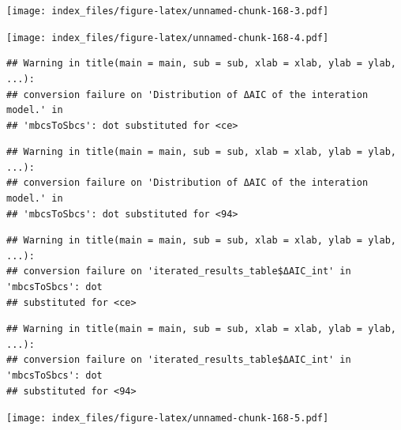 \documentclass[
]{article}
\newenvironment{Shaded}{\begin{snugshade}}{\end{snugshade}}
\newcommand{\AttributeTok}[1]{\textcolor[rgb]{0.77,0.63,0.00}{#1}}
\newcommand{\FunctionTok}[1]{\textcolor[rgb]{0.00,0.00,0.00}{#1}}
\newcommand{\NormalTok}[1]{#1}
\newcommand{\SpecialCharTok}[1]{\textcolor[rgb]{0.00,0.00,0.00}{#1}}
\newcommand{\StringTok}[1]{\textcolor[rgb]{0.31,0.60,0.02}{#1}}
\begin{document}
\texttt{[image: index\_files/figure-latex/unnamed-chunk-168-3.pdf]}

\begin{Shaded}
\end{Shaded}

\texttt{[image: index\_files/figure-latex/unnamed-chunk-168-4.pdf]}

\begin{Shaded}
\end{Shaded}

\begin{verbatim}
## Warning in title(main = main, sub = sub, xlab = xlab, ylab = ylab, ...):
## conversion failure on 'Distribution of ΔAIC of the interation model.' in
## 'mbcsToSbcs': dot substituted for <ce>
\end{verbatim}

\begin{verbatim}
## Warning in title(main = main, sub = sub, xlab = xlab, ylab = ylab, ...):
## conversion failure on 'Distribution of ΔAIC of the interation model.' in
## 'mbcsToSbcs': dot substituted for <94>
\end{verbatim}

\begin{verbatim}
## Warning in title(main = main, sub = sub, xlab = xlab, ylab = ylab, ...):
## conversion failure on 'iterated_results_table$ΔAIC_int' in 'mbcsToSbcs': dot
## substituted for <ce>
\end{verbatim}

\begin{verbatim}
## Warning in title(main = main, sub = sub, xlab = xlab, ylab = ylab, ...):
## conversion failure on 'iterated_results_table$ΔAIC_int' in 'mbcsToSbcs': dot
## substituted for <94>
\end{verbatim}

\texttt{[image: index\_files/figure-latex/unnamed-chunk-168-5.pdf]}
\end{document}
